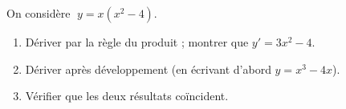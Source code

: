 \begin{exo}
On considère $\;y=x(x^{2}-4)$.
\begin{enumerate}[label=\alph*),leftmargin=1.6em,itemsep=1pt]
\item Dériver par la règle du produit ; montrer que $y'=3x^{2}-4$.
\item Dériver après développement (en écrivant d'abord $y=x^{3}-4x$).
\item Vérifier que les deux résultats coïncident.
\end{enumerate}
\end{exo}


